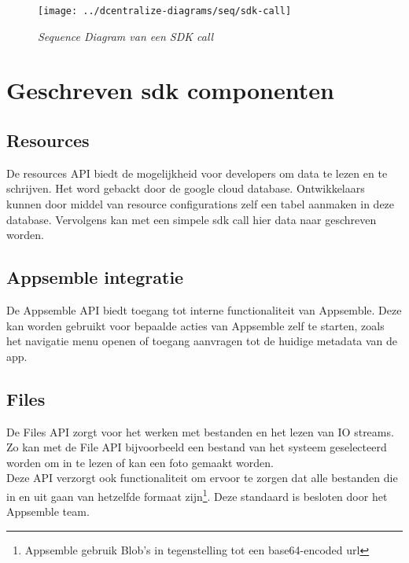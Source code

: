 \begin{figure}
	\centering
	\texttt{[image: ../dcentralize-diagrams/seq/sdk-call]}
	\caption{\textit{Sequence Diagram van een SDK call}}
	\label{fig:sdk-call}
\end{figure}

\section{Geschreven sdk componenten}

\subsection{Resources}

De resources API biedt de mogelijkheid voor developers om data te lezen en te schrijven. Het word gebackt door de google cloud database. Ontwikkelaars kunnen door middel van resource configurations zelf een tabel aanmaken in deze database. Vervolgens kan met een simpele sdk call hier data naar geschreven worden.

\subsection{Appsemble integratie}

De Appsemble API biedt toegang tot interne functionaliteit van Appsemble. Deze kan worden gebruikt voor bepaalde acties van Appsemble zelf te starten, zoals het navigatie menu openen of toegang aanvragen tot de huidige metadata van de app.

\subsection{Files}

De Files API zorgt voor het werken met bestanden en het lezen van IO streams. Zo kan met de File API bijvoorbeeld een bestand van het systeem geselecteerd worden om in te lezen of kan een foto gemaakt worden. \\

Deze API verzorgt ook functionaliteit om ervoor te zorgen dat alle bestanden die in en uit gaan van hetzelfde formaat zijn\footnote{Appsemble gebruik Blob's in tegenstelling tot een base64-encoded url}. Deze standaard is besloten door het Appsemble team.